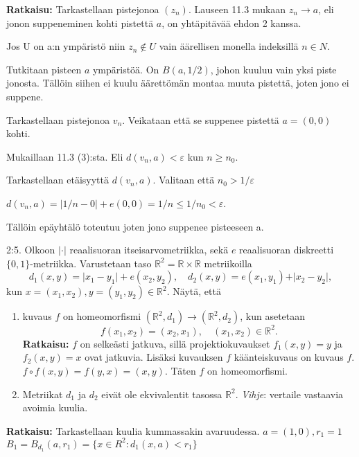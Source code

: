 \documentclass[12pt,a4paper,leqno]{amsart}
\begin{document}
\textbf{Ratkaisu: }
Tarkastellaan pistejonoa $(z_n)$.
Lauseen 11.3 mukaan $z_n \rightarrow a$, eli jonon suppeneminen kohti pistettä $a$, on yhtäpitävää ehdon 2 kanssa.

Jos U on a:n ympäristö niin $z_n \notin U$ vain äärellisen monella indeksillä $n \in N$. 

Tutkitaan pisteen $a$ ympäristöä. On $B(a, 1/2)$, johon kuuluu vain yksi piste jonosta. Tällöin siihen ei kuulu äärettömän montaa muuta pistettä, joten jono ei suppene. %

Tarkastellaan pistejonoa $v_n$. Veikataan että se suppenee pistettä $a=(0, 0)$ kohti. 

Mukaillaan 11.3 (3):sta. Eli $d(v_n, a) < \varepsilon$ kun $n \geq n_0$.

Tarkastellaan etäisyyttä $d(v_n, a)$. Valitaan että $n_0 > 1 / \varepsilon$ 

$d(v_n, a) = |1/n - 0| + e(0, 0) = 1/n \leq 1/n_0 < \varepsilon$.

Tällöin epäyhtälö toteutuu joten jono suppenee pisteeseen a.

\bigskip

 2:5. Olkoon $\vert \cdot \vert$ reaalisuoran itseisarvometriikka, sekä $e$ reaalisuoran diskreetti $\{0,1\}$-metriikka. Varustetaan taso 
$\mathbb R^2 = \mathbb R \times \mathbb R$ metriikoilla 
\[
d_1(x,y) = \vert x_1 - y_1\vert + e(x_2,y_2),  \quad d_2(x,y) =   e(x_1,y_1) + \vert x_2 - y_2\vert ,
\]
 kun $x = (x_1,x_2), y = (y_1,y_2) \in \mathbb R^2$. Näytä, että 

\begin{enumerate}
\item kuvaus $f$ on homeomorfismi $(\mathbb R^2,d_1) \to (\mathbb R^2,d_2)$, kun asetetaan 
\[
f(x_1,x_2) = (x_2,x_1), \quad (x_1,x_2) \in \mathbb R^2.
\]
\textbf{Ratkaisu: }
$f$ on selkeästi jatkuva, sillä projektiokuvaukset $f_1(x, y) = y$  ja $f_2(x, y) = x$ ovat jatkuvia. Lisäksi kuvauksen $f$ käänteiskuvaus on kuvaus $f$. $f \circ f (x, y) = f(y, x) = (x, y)$. Täten $f$ on homeomorfismi.

\smallskip

\item Metriikat $d_1$ ja $d_2$ eivät ole ekvivalentit tasossa $\mathbb R^2$.  \textit{Vihje}: vertaile vastaavia avoimia kuulia.

\end{enumerate}
\textbf{Ratkaisu: } Tarkastellaan kuulia kummassakin avaruudessa.
$a = (1, 0), r_1 = 1$
$B_1 = B_{d_1}(a, r_1) = \{x \in R^2 : d_1(x, a) < r_1\}$
\end{document}
